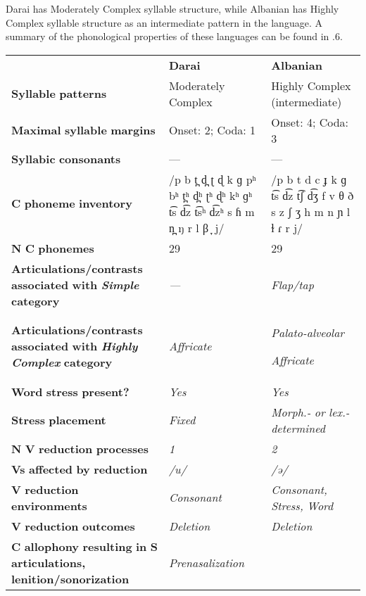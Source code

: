   Darai has Moderately Complex syllable structure, while Albanian has Highly Complex syllable structure as an intermediate pattern in the language. A summary of the phonological properties of these languages can be found in .6.

\begin{table}
\begin{tabularx}{\textwidth}{XXX}
\lsptoprule
 & \textbf{Darai} & \textbf{Albanian}\\
 \textbf{Syllable} \textbf{patterns} & Moderately Complex & Highly Complex (intermediate)\\
 \textbf{Maximal} \textbf{syllable} \textbf{margins} & Onset: 2; Coda: 1 & Onset: 4; Coda: 3\\
 \textbf{Syllabic} \textbf{consonants} & — & —\\
 \textbf{C} \textbf{phoneme} \textbf{inventory} & /p b t̪ d̪ ʈ ɖ k ɡ pʰ bʰ t̪ʰ d̪ʰ ʈʰ ɖʰ kʰ ɡʰ t͡s d͡z t͡sʰ d͡zʰ s ɦ m n̪ ŋ r l β ̞ j/ & /p b t d c ɟ k ɡ t͡s d͡z t͡ʃ d͡ʒ f v θ ð s z ʃ ʒ h m n ɲ l ɫ ɾ r j/\\
 \textbf{N} \textbf{C} \textbf{phonemes} & 29 & 29\\
 \textbf{Articulations/contrasts} \textbf{associated} \textbf{with} \textbf{\textit{Simple}} \textbf{category} & \textit{—} & \textit{Flap/tap}\\
 \textbf{Articulations/contrasts} \textbf{associated} \textbf{with} \textbf{\textit{Highly} \textit{Complex}} \textbf{category} & \textit{Affricate} & { \textit{Palato-alveolar}}

 \textit{Affricate}\\
 \textbf{Word} \textbf{stress} \textbf{present?} & \textit{Yes} & \textit{Yes}\\
 \textbf{Stress} \textbf{placement} & \textit{Fixed} & \textit{Morph.-} \textit{or} \textit{lex.-determined}\\
 \textbf{N} \textbf{V} \textbf{reduction} \textbf{processes} & \textit{1} & \textit{2}\\
 \textbf{Vs} \textbf{affected} \textbf{by} \textbf{reduction}  & \textit{/u/} & \textit{/ə/}\\
 \textbf{V} \textbf{reduction} \textbf{environments} & \textit{Consonant} & \textit{Consonant,} \textit{Stress,} \textit{Word}\\
 \textbf{V} \textbf{reduction} \textbf{outcomes} & \textit{Deletion} & \textit{Deletion}\\
 \textbf{C} \textbf{allophony} \textbf{resulting} \textbf{in} \textbf{S} \textbf{articulations,} \textbf{lenition/sonorization} & { \textit{Prenasalization}}


\end{tabularx}
\end{table}
